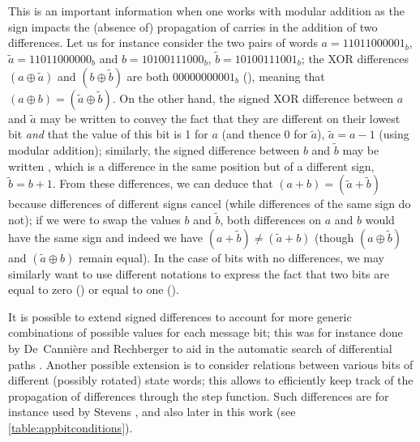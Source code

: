 This is an important information when one works with modular addition as the sign impacts the (absence of) propagation of carries in the addition of two differences.
Let us for instance consider the two pairs of words $a = 11011000001_b$, $\widetilde{a} = 11011000000_b$ and $b = 10100111000_b$, $\widetilde{b} = 10100111001_b$; the XOR
differences $(a \oplus \widetilde{a})$ and $(b \oplus \widetilde{b})$ are both $00000000001_b$ (\ie \nodiff\nodiff\nodiff\nodiff\nodiff\nodiff\nodiff\nodiff\nodiff\nodiff\onediff),
meaning that $(a \oplus b) = (\widetilde{a} \oplus \widetilde{b})$. On the other hand, the signed
XOR difference between $a$ and $\widetilde{a}$ may be written \nodiff\nodiff\nodiff\nodiff\nodiff\nodiff\nodiff\nodiff\nodiff\nodiff\onediffd to convey the fact that they are different on their lowest bit \emph{and} that
the value of this bit is 1 for $a$ (and thence 0 for $\widetilde{a}$), \ie $\widetilde{a} = a - 1$ (using modular addition); similarly, the signed difference between $b$ and $\widetilde{b}$ may be written
\nodiff\nodiff\nodiff\nodiff\nodiff\nodiff\nodiff\nodiff\nodiff\nodiff\onediffu, which is a difference in the same position but of a different sign, \ie $\widetilde{b} = b + 1$. From these differences, we can deduce that $(a + b) = (\widetilde{a} + \widetilde{b})$
because differences of different signs cancel (while differences of the same sign do not); if we were to swap the values $b$ and $\widetilde{b}$, both differences on $a$ and $b$ would have the same sign and
indeed we have $(a + \widetilde{b}) \neq (\widetilde{a} + b)$ (though $(a \oplus \widetilde{b})$ and $(\widetilde{a} \oplus b)$ remain equal).
In the case of bits with no differences, we may similarly want to use different notations to express the fact that two bits are equal to zero (\nodiffz) or equal to one (\nodiffo).

It is possible to extend signed differences to account for more generic combinations of possible
values for each message bit; this was for instance done by De~Canni\`ere and Rechberger to aid in the automatic search of differential paths \cite{DBLP:conf/asiacrypt/CanniereR06}.
Another possible extension  is to consider relations between various bits of different (possibly rotated) state words;
this allows to efficiently keep track of the propagation of differences through the step function. Such differences are for instance used by Stevens \cite{DBLP:conf/eurocrypt/Stevens13},
and also later in this work (see \autoref{table:appbitconditions}).

\medskip


